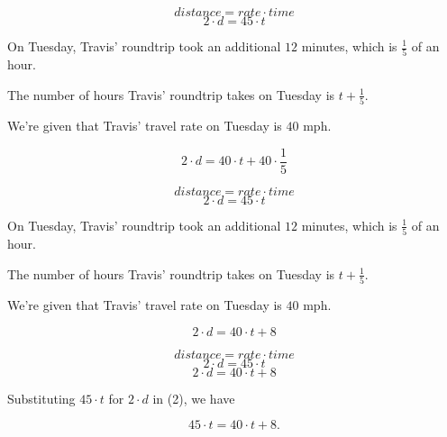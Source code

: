 \documentclass{beamer} %
\begin{document}
\setcounter{equation}{0}

\begin{frame}
\[
distance = rate \cdot time
\]
\begin{equation}
2\cdot d = 45\cdot t
\end{equation}

On Tuesday, Travis' roundtrip took an additional $12$ minutes, which is $\frac{1}{5}$ of an hour.

The number of hours Travis' roundtrip takes on Tuesday is $t + \frac{1}{5}$.

We're given that Travis' travel rate on Tuesday is $40$ mph.

\begin{equation}
2\cdot d = 40\cdot t + 40\cdot \frac{1}{5}
\end{equation}
\end{frame}

\setcounter{equation}{0}

\begin{frame}
\[
distance = rate \cdot time
\]
\begin{equation}
2\cdot d = 45\cdot t
\end{equation}

On Tuesday, Travis' roundtrip took an additional $12$ minutes, which is $\frac{1}{5}$ of an hour.

The number of hours Travis' roundtrip takes on Tuesday is $t + \frac{1}{5}$.

We're given that Travis' travel rate on Tuesday is $40$ mph.

\begin{equation}
2\cdot d = 40\cdot t + 8
\end{equation}
\end{frame}

\setcounter{equation}{0}

\begin{frame}
\[
distance = rate \cdot time
\]
\begin{equation}
2\cdot d = 45\cdot t
\end{equation}
\begin{equation}
2\cdot d = 40\cdot t + 8
\end{equation}

\pause Substituting $45\cdot t$ for $2\cdot d$ in (2), we have \pause

\[
45\cdot t = 40\cdot t + 8.
\]
\end{frame}

\setcounter{equation}{0}
\end{document}
